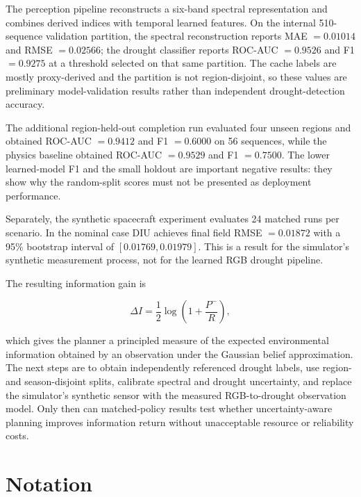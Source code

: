 \documentclass[11pt,a4paper]{article}
\begin{document}
The perception pipeline reconstructs a six-band spectral
representation and combines derived indices with temporal learned
features. On the internal 510-sequence validation partition, the
spectral reconstruction reports MAE $=0.01014$ and RMSE $=0.02566$;
the drought classifier reports ROC-AUC $=0.9526$ and F1 $=0.9275$ at
a threshold selected on that same partition. The cache labels are
mostly proxy-derived and the partition is not region-disjoint, so
these values are preliminary model-validation results rather than
independent drought-detection accuracy.

The additional region-held-out completion run evaluated four unseen
regions and obtained ROC-AUC $=0.9412$ and F1 $=0.6000$ on 56 sequences,
while the physics baseline obtained ROC-AUC $=0.9529$ and F1 $=0.7500$.
The lower learned-model F1 and the small holdout are important negative
results: they show why the random-split scores must not be presented as
deployment performance.

Separately, the synthetic spacecraft experiment evaluates 24 matched
runs per scenario. In the nominal case DIU achieves final field RMSE
$=0.01872$ with a 95\% bootstrap interval of
$[0.01769,0.01979]$. This is a result for the simulator's synthetic
measurement process, not for the learned RGB drought pipeline.

The resulting information gain is

\begin{equation}
\boxed{
\Delta I
=
\frac12
\log
\left(
1+\frac{P^-}{R}
\right),
}
\end{equation}

which gives the planner a principled measure of the expected
environmental information obtained by an observation under the
Gaussian belief approximation. The next steps are to obtain
independently referenced drought labels, use region- and
season-disjoint splits, calibrate spectral and drought uncertainty,
and replace the simulator's synthetic sensor with the measured
RGB-to-drought observation model. Only then can matched-policy results
test whether uncertainty-aware planning improves information return
without unacceptable resource or reliability costs.


\appendix

\section{Notation}
\end{document}
